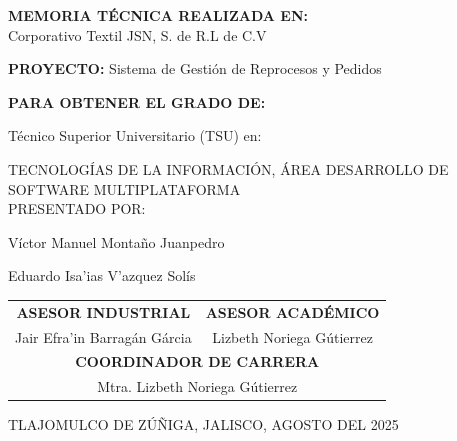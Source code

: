 \documentclass[12pt,letterpaper,spanish]{report}
\begin{document}
\begin{center}

\large{\textbf{MEMORIA TÉCNICA REALIZADA EN:}}
 \\  Corporativo Textil JSN, S. de R.L de C.V

\centerline{\hbox{}}

\large{\textbf{PROYECTO:} Sistema de Gestión de Reprocesos y Pedidos}

\vspace{0.1in}
\large{\textbf{PARA OBTENER EL GRADO DE:}}

\large{Técnico Superior Universitario (TSU) en:}
\vspace{0.05in}

\large{TECNOLOGÍAS DE LA INFORMACIÓN, ÁREA DESARROLLO DE SOFTWARE MULTIPLATAFORMA }
\\
\large{PRESENTADO POR:}


Víctor Manuel Montaño Juanpedro %


Eduardo Isa'ias V'azquez Solís %

\vspace{0.5in}

\begin{tabular}{cc}
    \textbf{ASESOR INDUSTRIAL} & \textbf{ASESOR ACADÉMICO} \\

    Jair Efra'in Barragán Gárcia & Lizbeth Noriega Gútierrez \\
    \multicolumn{2}{c}{\textbf{COORDINADOR DE CARRERA}
    \vspace{0.4in}
    } \\

    \multicolumn{2}{c}{
            Mtra. Lizbeth Noriega Gútierrez }
    \end{tabular}

\end{center}
\begin{flushright}\small{ TLAJOMULCO DE ZÚÑIGA, JALISCO, AGOSTO DEL 2025} \end{flushright}



\end{document}

